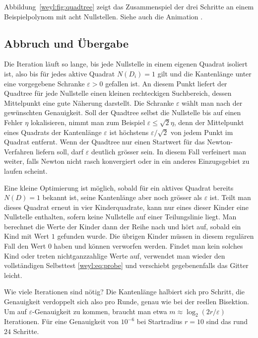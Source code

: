 Abbildung~\ref{weyl:fig:quadtree} zeigt das Zusammenspiel der drei Schritte an einem
Beispielpolynom mit acht Nullstellen. Siehe auch die Animation \cite{weyl:quadtree-video}.



\subsection{Abbruch und Übergabe%
\label{weyl:subsection:abbruch}}
Die Iteration läuft so lange, bis jede Nullstelle in einem eigenen Quadrat isoliert
ist, also bis für jedes aktive Quadrat $N(D_i) = 1$ gilt und die Kantenlänge unter eine
vorgegebene Schranke $\varepsilon > 0$ gefallen ist.
An diesem Punkt liefert der Quadtree für jede Nullstelle einen kleinen rechteckigen
Suchbereich, dessen Mittelpunkt eine gute Näherung darstellt.
Die Schranke $\varepsilon$ wählt man nach der gewünschten Genauigkeit.
Soll der Quadtree selbst die Nullstelle bis auf einen Fehler $\eta$ lokalisieren,
nimmt man zum Beispiel $\varepsilon \leq \sqrt{2}\eta$, denn der Mittelpunkt eines
Quadrats der Kantenlänge $\varepsilon$ ist höchstens $\varepsilon/\sqrt{2}$ von
jedem Punkt im Quadrat entfernt.
Wenn der Quadtree nur einen Startwert für das Newton-Verfahren liefern soll, darf
$\varepsilon$ deutlich grösser sein.
In diesem Fall verfeinert man weiter, falls Newton nicht rasch konvergiert oder in
ein anderes Einzugsgebiet zu laufen scheint.

Eine kleine Optimierung ist möglich, sobald für ein aktives Quadrat bereits
$N(D)=1$ bekannt ist, seine Kantenlänge aber noch grösser als $\varepsilon$ ist.
Teilt man dieses Quadrat erneut in vier Kinderquadrate, kann nur eines dieser
Kinder eine Nullstelle enthalten, sofern keine Nullstelle auf einer Teilungslinie
liegt.
Man berechnet die Werte der Kinder dann der Reihe nach und hört auf, sobald ein
Kind mit Wert $1$ gefunden wurde.
Die übrigen Kinder müssen in diesem regulären Fall den Wert $0$ haben und können
verworfen werden.
Findet man kein solches Kind oder treten nichtganzzahlige Werte auf, verwendet man
wieder den vollständigen Selbsttest \eqref{weyl:eq:probe} und verschiebt gegebenenfalls
das Gitter leicht.

Wie viele Iterationen sind nötig?
Die Kantenlänge halbiert sich pro Schritt, die Genauigkeit verdoppelt sich also
pro Runde, genau wie bei der reellen Bisektion.
Um auf $\varepsilon$-Genauigkeit zu kommen, braucht man etwa
$m \approx \log_2(2r/\varepsilon)$ Iterationen.
Für eine Genauigkeit von $10^{-6}$ bei Startradius $r = 10$ sind das rund $24$ Schritte.

